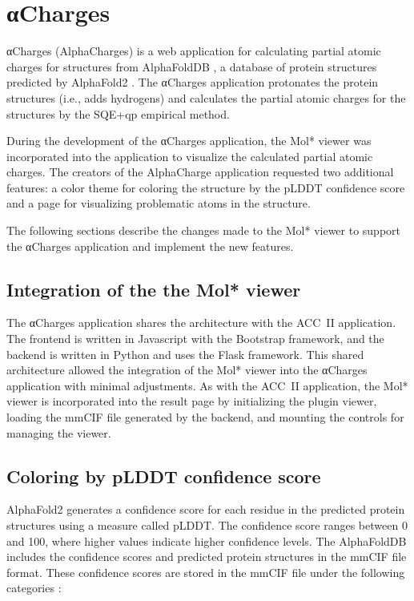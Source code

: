 \documentclass[
  digital,     %
  oneside,     %
  nosansbold,  %
  nocolorbold, %
  lof,         %
  lot,         %
]{fithesis4}
\begin{document}
\newpage

\chapter{αCharges}
\label{chapter:alphacharges}

αCharges (AlphaCharges) is a web application for calculating partial atomic charges for structures from AlphaFoldDB \cite{varadi2021alphafold}, a database of protein structures predicted by AlphaFold2 \cite{jumper2021alphafold}. The αCharges application protonates the protein structures (i.e., adds hydrogens) and calculates the partial atomic charges for the structures by the SQE+qp \cite{schindler2021sqe} empirical method. \cite{schindler2023alphacharges}

During the development of the αCharges application, the Mol* viewer was incorporated into the application to visualize the calculated partial atomic charges. The creators of the AlphaCharge application requested two additional features: a color theme for coloring the structure by the pLDDT confidence score and a page for visualizing problematic atoms in the structure.

The following sections describe the changes made to the Mol* viewer to support the αCharges application and implement the new features.

\section{Integration of the the Mol* viewer}

The αCharges application shares the architecture with the ACC~II application. The frontend is written in Javascript with the Bootstrap framework, and the backend is written in Python and uses the Flask framework. \cite{schindler2023alphacharges} This shared architecture allowed the integration of the Mol* viewer into the αCharges application with minimal adjustments. As with the ACC~II application, the Mol* viewer is incorporated into the result page by initializing the plugin viewer, loading the mmCIF file generated by the backend, and mounting the controls for managing the viewer.

\section{Coloring by pLDDT confidence score}

AlphaFold2 generates a confidence score for each residue in the predicted protein structures using a measure called pLDDT. The confidence score ranges between 0 and 100, where higher values indicate higher confidence levels. \cite{varadi2021alphafold} The AlphaFoldDB includes the confidence scores and predicted protein structures in the mmCIF file format. These confidence scores are stored in the mmCIF file under the following categories \cite{mmcif_dictionary}:
\end{document}
